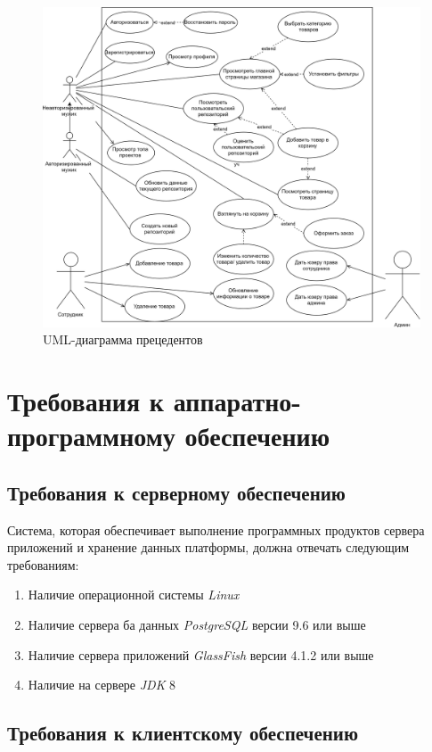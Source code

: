 \documentclass[12pt, a4paper]{article}
\begin{document}
\begin{figure}[H]
  \centering
  \includegraphics[width=16cm]{uml-precedents.png}
  \caption{UML-диаграмма прецедентов}
\end{figure}

\section{Требования к аппаратно-программному обеспечению}

\subsection{Требования к серверному обеспечению}

Система, которая обеспечивает выполнение программных продуктов сервера 
приложений и хранение данных платформы, должна отвечать следующим требованиям:

\begin{enumerate}
\item Наличие операционной системы \textit{Linux}
\item Наличие сервера ба данных \textit{PostgreSQL} 
  версии 9.6 или выше
\item Наличие сервера приложений \textit{GlassFish} версии
  4.1.2 или выше
\item Наличие на сервере \textit{JDK} 8
\end{enumerate}

\subsection{Требования к клиентскому обеспечению}
\end{document}
